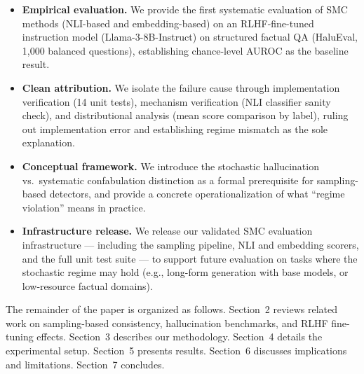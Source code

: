 \begin{itemize}
  \item[\textbf{C1}] \textbf{Empirical evaluation.} We provide the first systematic evaluation of SMC methods (NLI-based and embedding-based) on an RLHF-fine-tuned instruction model (Llama-3-8B-Instruct) on structured factual QA (HaluEval, 1,000 balanced questions), establishing chance-level AUROC as the baseline result.

  \item[\textbf{C2}] \textbf{Clean attribution.} We isolate the failure cause through implementation verification (14 unit tests), mechanism verification (NLI classifier sanity check), and distributional analysis (mean score comparison by label), ruling out implementation error and establishing regime mismatch as the sole explanation.

  \item[\textbf{C3}] \textbf{Conceptual framework.} We introduce the stochastic hallucination vs.\ systematic confabulation distinction as a formal prerequisite for sampling-based detectors, and provide a concrete operationalization of what ``regime violation'' means in practice.

  \item[\textbf{C4}] \textbf{Infrastructure release.} We release our validated SMC evaluation infrastructure --- including the sampling pipeline, NLI and embedding scorers, and the full unit test suite --- to support future evaluation on tasks where the stochastic regime may hold (e.g., long-form generation with base models, or low-resource factual domains).
\end{itemize}

The remainder of the paper is organized as follows. Section~2 reviews related work on sampling-based consistency, hallucination benchmarks, and RLHF fine-tuning effects. Section~3 describes our methodology. Section~4 details the experimental setup. Section~5 presents results. Section~6 discusses implications and limitations. Section~7 concludes.
